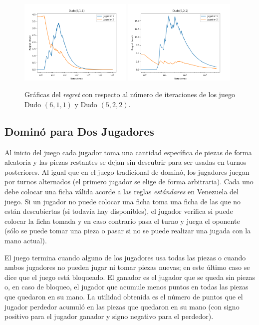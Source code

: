 \begin{figure}[h]
    \centering
    \includegraphics[width=0.48\textwidth]{graficas/cfr/dudo/Dudo(6,1,1).png}
    \includegraphics[width=0.48\textwidth]{graficas/cfr/dudo/Dudo(5,2,2).png}
    \caption{Gráficas del \textit{regret} con respecto al número de iteraciones de los juego Dudo $(6, 1, 1)$ y Dudo $(5, 2, 2)$.}
    \label{fig:cfr-regret-dudo-5-2-2}
\end{figure}

\subsection*{Dominó para Dos Jugadores}

Al inicio del juego cada jugador toma una cantidad específica de piezas de forma aleatoria y las piezas restantes se dejan sin descubrir para ser usadas en turnos posteriores. Al igual que en el juego tradicional de dominó, los jugadores juegan por turnos alternados (el primero jugador se elige de forma arbitraria). Cada uno debe colocar una ficha válida acorde a las reglas \textit{estándares} en Venezuela del juego. Si un jugador no puede colocar una ficha toma una ficha de las que no están descubiertas (si todavía hay disponibles), el jugador verifica si puede colocar la ficha tomada y en caso contrario pasa el turno y juega el oponente (sólo se puede tomar una pieza o pasar si no se puede realizar una jugada con la mano actual).

El juego termina cuando alguno de los jugadores usa todas las piezas o cuando ambos jugadores no pueden jugar ni tomar piezas nuevas; en este último caso se dice que el juego está bloqueado. El ganador es el jugador que se queda sin piezas o, en caso de bloqueo, el jugador que acumule menos puntos en todas las piezas que quedaron en su mano. La utilidad obtenida es el número de puntos que el jugador perdedor acumuló en las piezas que quedaron en su mano (con signo positivo para el jugador ganador y signo negativo para el perdedor).

